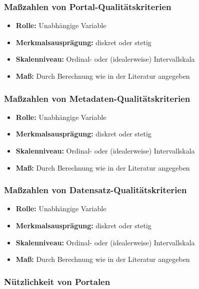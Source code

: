 \documentclass[a4paper,10pt,german,public]{INSOexpose}
\begin{document}
\subsubsection{Maßzahlen von Portal-Qualitätskriterien}

\begin{itemize}
    \item \textbf{Rolle:} Unabhängige Variable
    \item \textbf{Merkmalsausprägung:} diskret oder stetig
    \item \textbf{Skalenniveau:} Ordinal- oder (idealerweise) Intervallskala
    \item \textbf{Maß:} Durch Berechnung wie in der Literatur angegeben
\end{itemize}

\subsubsection{Maßzahlen von Metadaten-Qualitätskriterien}

\begin{itemize}
    \item \textbf{Rolle:} Unabhängige Variable
    \item \textbf{Merkmalsausprägung:} diskret oder stetig
    \item \textbf{Skalenniveau:} Ordinal- oder (idealerweise) Intervallskala
    \item \textbf{Maß:} Durch Berechnung wie in der Literatur angegeben
\end{itemize}

\subsubsection{Maßzahlen von Datensatz-Qualitätskriterien}

\begin{itemize}
    \item \textbf{Rolle:} Unabhängige Variable
    \item \textbf{Merkmalsausprägung:} diskret oder stetig
    \item \textbf{Skalenniveau:} Ordinal- oder (idealerweise) Intervallskala
    \item \textbf{Maß:} Durch Berechnung wie in der Literatur angegeben
\end{itemize}

\subsubsection{Nützlichkeit von Portalen}
\end{document}
